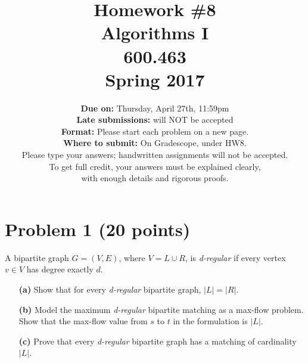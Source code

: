 \documentclass[letterpaper, 11pt]{article}
\begin{document}
\title{Homework \#8 \\ Algorithms I \\ 600.463 \\Spring 2017}
\author{\textbf{Due on:} Thursday, April 27th, 11:59pm \\
\textbf{Late submissions:} will NOT be accepted\\
\textbf{Format:} Please start each problem on a new page.
\\\textbf{Where to submit:} On Gradescope, under HW8.
\\ Please type your answers; handwritten assignments will not be accepted.
\\ To get full credit, your answers must be explained clearly,\\ with enough details
and rigorous proofs.
\\}

\maketitle


\section{Problem 1 (20 points)}

A bipartite graph $G=(V,E)$, where $V = L \cup R$, is \textit{d-regular} if every vertex $v \in V$ has degree exactly $d$.  
\begin{itemize}
\item[\textbf{(a)}] Show that for every \textit{d-regular} bipartite graph, $|L|=|R|$.
\item[\textbf{(b)}] Model the maximum \textit{d-regular} bipartite matching as a max-flow problem. Show that the max-flow value from $s$ to $t$ in the formulation is $|L|$.
\item[\textbf{(c)}] Prove that every \textit{d-regular} bipartite graph has a matching of cardinality $|L|$.

\end{itemize}
\newpage
\end{document}
